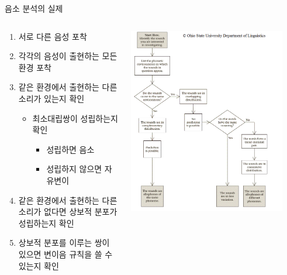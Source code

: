 \documentclass[11pt, aspectratio=169]{beamer}
\begin{document}
\begin{frame}[t]{음소 분석의 실제}
    \begin{columns}
        \begin{column}[T]{0.46\textwidth}
            \begin{enumerate}
                \item 서로 다른 음성 포착
                \item 각각의 음성이 출현하는 모든 환경 포착
                \item 같은 환경에서 출현하는 다른 소리가 있는지 확인
                    \begin{itemize}
                        \item 최소대립쌍이 성립하는지 확인
                            \begin{itemize}
                                \item 성립하면 음소
                                \item 성립하지 않으면 자유변이
                            \end{itemize}
                    \end{itemize}
                \item 같은 환경에서 출현하는 다른 소리가 없다면 상보적 분포가 성립하는지 확인
                \item 상보적 분포를 이루는 쌍이 있으면 변이음 규칙을 쓸 수 있는지 확인
            \end{enumerate}            
        \end{column}
        \begin{column}[T]{0.47\textwidth}
            \includegraphics[width=0.9\textwidth]{img/phonology-flowchart.png}
        \end{column}
    \end{columns}
\end{frame}
\end{document}
